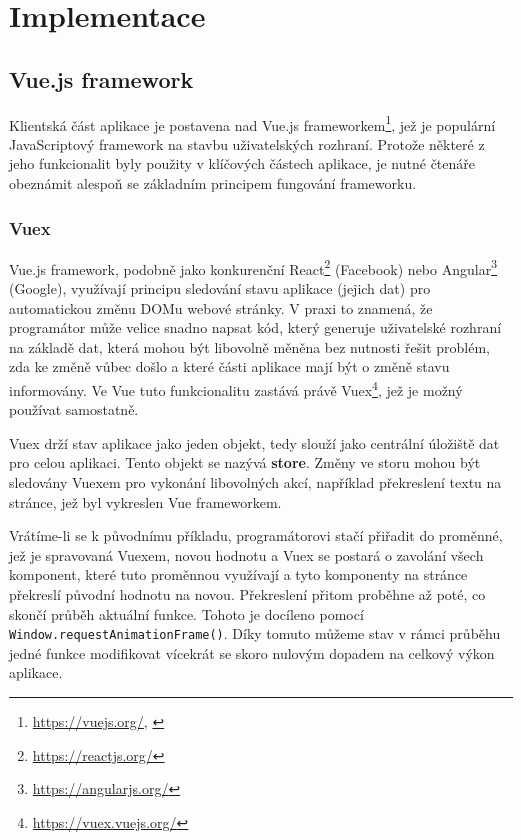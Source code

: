 \chapter{Implementace}

\section{Vue.js framework}
Klientská část aplikace je postavena nad Vue.js frameworkem\footnote{\url{https://vuejs.org/}, \citet*{Vue}}, jež je populární JavaScriptový framework na stavbu uživatelských rozhraní. Protože některé z jeho funkcionalit byly použity v klíčových částech aplikace, je nutné čtenáře obeznámit alespoň se základním principem fungování frameworku.

\subsection{Vuex}
Vue.js framework, podobně jako konkurenční React\footnote{\url{https://reactjs.org/}} (Facebook) nebo Angular\footnote{\url{https://angularjs.org/}} (Google), využívají principu sledování stavu aplikace (jejich dat) pro automatickou změnu DOMu webové stránky. V praxi to znamená, že programátor může velice snadno napsat kód, který generuje uživatelské rozhraní na základě dat, která mohou být libovolně měněna bez nutnosti řešit problém, zda ke změně vůbec došlo a které části aplikace mají být o změně stavu informovány. Ve Vue tuto funkcionalitu zastává právě Vuex\footnote{\url{https://vuex.vuejs.org/}}, jež je možný používat samostatně.

Vuex drží stav aplikace jako jeden objekt, tedy slouží jako centrální úložiště dat pro celou aplikaci. Tento objekt se nazývá \textbf{store}. Změny ve storu mohou být sledovány Vuexem pro vykonání libovolných akcí, například překreslení textu na stránce, jež byl vykreslen Vue frameworkem.

\newcommand{\inlinecode}{\texttt}

Vrátíme-li se k původnímu příkladu, programátorovi stačí přiřadit do proměnné, jež je spravovaná Vuexem, novou hodnotu a Vuex se postará o zavolání všech komponent, které tuto proměnnou využívají a tyto komponenty na stránce překreslí původní hodnotu na novou. Překreslení přitom proběhne až poté, co skončí průběh aktuální funkce. Tohoto je docíleno pomocí \\  \texttt{Window.requestAnimationFrame()}. Díky tomuto můžeme stav v rámci průběhu jedné funkce modifikovat vícekrát se skoro nulovým dopadem na celkový výkon aplikace.


